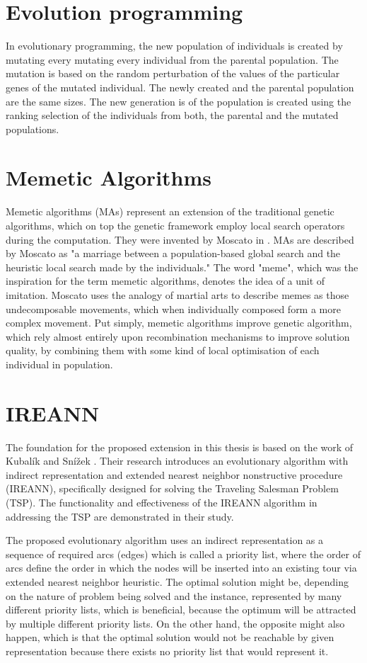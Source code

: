 \documentclass[twoside]{ctuthesis}
\theoremstyle{plain}
\theoremstyle{definition}
\theoremstyle{note}
\begin{document}
\section{Evolution programming}
In evolutionary programming, the new population of individuals is created by mutating every mutating every individual from the parental population. The mutation is based on the random perturbation of the values of the particular genes of the mutated individual. The newly created and the parental population are the same sizes. The new generation is of the population is created using the ranking selection of the individuals from both, the parental and the mutated populations.

\section{Memetic Algorithms}
Memetic algorithms (MAs) represent an extension of the traditional genetic algorithms, which on top the genetic framework employ local search operators during the computation. They were invented by Moscato in \cite{moscato1989evolution}. MAs are described by Moscato as "a marriage between a population-based global search and the heuristic local search made by the individuals." The word "meme", which was the inspiration for the term memetic algorithms, denotes the idea of a unit of imitation. Moscato uses the analogy of martial arts to describe memes as those undecomposable movements, which when individually composed form a more complex movement. Put simply, memetic algorithms improve genetic algorithm, which rely almost entirely upon recombination mechanisms to improve solution quality, by combining them with some kind of local optimisation of each individual in population. 

\section{IREANN}
The foundation for the proposed extension in this thesis is based on the work of Kubalík and Snížek \cite{kubalik2014novel}. Their research introduces an evolutionary algorithm with indirect representation and extended nearest neighbor nonstructive procedure (IREANN), specifically designed for solving the Traveling Salesman Problem (TSP). The functionality and effectiveness of the IREANN algorithm in addressing the TSP are demonstrated in their study.

The proposed evolutionary algorithm uses an indirect representation as a sequence of required arcs (edges) which is called a priority list, where the order of arcs define the order in which the nodes will be inserted into an existing tour via extended nearest neighbor heuristic.
The optimal solution might be, depending on the nature of problem being solved and the instance, represented by many different priority lists, which is beneficial, because the optimum will be attracted by multiple different priority lists. On the other hand, the opposite might also happen, which is that the optimal solution would not be reachable by given representation because there exists no priority list that would represent it.
\end{document}
